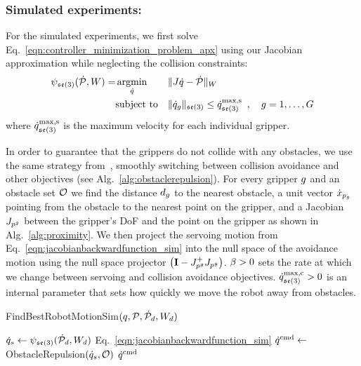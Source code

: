 \subsubsection{Simulated experiments:}

For the simulated experiments, we first solve Eq.~\eqref{eqn:controller_minimization_problem_apx} using our Jacobian approximation while neglecting the collision constraints:
\begin{equation}
\begin{aligned}
    \psi_{\mathfrak{se}(3)}(\dot{\mathcal{P}}, W) =
        &\operatorname*{argmin}_{\dot{q} }
            & & \| J \dot{q} - \dot{\mathcal{P}} \|_{W} \\
        &\textrm{subject to}
            & & \| \dot{q}_g \|_{\mathfrak{se}(3)} \leq \dot{q}^\textrm{max,s}_{\mathfrak{se}(3)} \enspace, \quad g = 1, \dots, G
    \label{eqn:jacobianbackwardfunction_sim}
\end{aligned}
\end{equation}
where $\dot{q}^\textrm{max,s}_{\mathfrak{se}(3)}$ is the maximum velocity for each individual gripper.

In order to guarantee that the grippers do not collide with any obstacles, we use the same strategy from~\cite{Berenson2013}, smoothly switching between collision avoidance and other objectives (see Alg.~\ref{alg:obstaclerepulsion}). For every gripper $g$ and an obstacle set $\mathcal{O}$ we find the distance $d_g$ to the nearest obstacle, a unit vector $\dot x_{p_g}$ pointing from the obstacle to the nearest point on the gripper, and a Jacobian $J_{p^g}$ between the gripper's DoF and the point on the gripper as shown in Alg.~\ref{alg:proximity}. We then project the servoing motion from Eq.~\eqref{eqn:jacobianbackwardfunction_sim} into the null space of the avoidance motion using the null space projector $\left(\mathbf{I} - J_{p^g}^+ J_{p^g} \right)$. $\beta > 0$ sets the rate at which we change between servoing and collision avoidance objectives. $\dot{q}^\textrm{max,c}_{\mathfrak{se}(3)} > 0$ is an internal parameter that sets how quickly we move the robot away from obstacles.





\begin{algorithm}[ht]
\caption{FindBestRobotMotionSim$(q, \mathcal{P}, \dot{\mathcal{P}}_d, W_d)$}
\label{alg:find_best_robot_motion_simulation}
\begin{algorithmic}[1]
    \State $\dot{q}_{s} \gets \psi_{\mathfrak{se}(3)} (\dot{\mathcal{P}}_d, W_d)$ \hfill Eq.~\eqref{eqn:jacobianbackwardfunction_sim}
    \State $\dot{q}^\textrm{cmd} \gets $ ObstacleRepulsion$(\dot{q}_{s}, \mathcal{O})$
    \State \Return $\dot{q}^\textrm{cmd}$
\end{algorithmic}
\end{algorithm}

